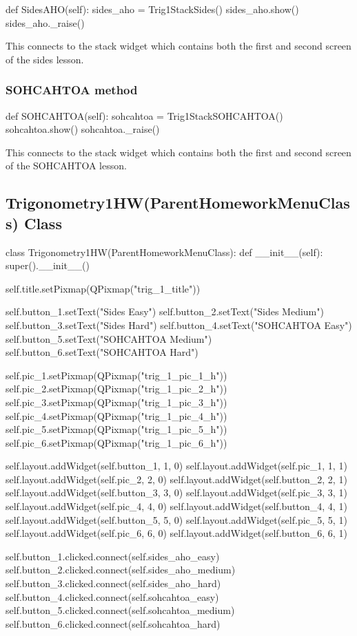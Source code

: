 \begin{python}
def SidesAHO(self):
        sides_aho = Trig1StackSides()
        sides_aho.show()
        sides_aho._raise()
\end{python}

This connects to the stack widget which contains both the first and second screen of the sides lesson.

\subsubsection{SOHCAHTOA method}

\begin{python}
def SOHCAHTOA(self):
        sohcahtoa = Trig1StackSOHCAHTOA()
        sohcahtoa.show()
        sohcahtoa._raise()
\end{python}

This connects to the stack widget which contains both the first and second screen of the SOHCAHTOA lesson.

\subsection{Trigonometry1HW(ParentHomeworkMenuClass) Class}

\begin{python}
class Trigonometry1HW(ParentHomeworkMenuClass):
    def __init__(self):
        super().__init__()

        self.title.setPixmap(QPixmap("trig_1_title"))

        self.button_1.setText("Sides Easy")
        self.button_2.setText("Sides Medium")
        self.button_3.setText("Sides Hard")
        self.button_4.setText("SOHCAHTOA Easy")
        self.button_5.setText("SOHCAHTOA Medium")
        self.button_6.setText("SOHCAHTOA Hard")

        self.pic_1.setPixmap(QPixmap("trig_1_pic_1_h"))
        self.pic_2.setPixmap(QPixmap("trig_1_pic_2_h"))
        self.pic_3.setPixmap(QPixmap("trig_1_pic_3_h"))
        self.pic_4.setPixmap(QPixmap("trig_1_pic_4_h"))
        self.pic_5.setPixmap(QPixmap("trig_1_pic_5_h"))
        self.pic_6.setPixmap(QPixmap("trig_1_pic_6_h"))

        self.layout.addWidget(self.button_1, 1, 0)
        self.layout.addWidget(self.pic_1, 1, 1)
        self.layout.addWidget(self.pic_2, 2, 0)
        self.layout.addWidget(self.button_2, 2, 1)
        self.layout.addWidget(self.button_3, 3, 0)
        self.layout.addWidget(self.pic_3, 3, 1)
        self.layout.addWidget(self.pic_4, 4, 0)
        self.layout.addWidget(self.button_4, 4, 1)
        self.layout.addWidget(self.button_5, 5, 0)
        self.layout.addWidget(self.pic_5, 5, 1)
        self.layout.addWidget(self.pic_6, 6, 0)
        self.layout.addWidget(self.button_6, 6, 1)

        self.button_1.clicked.connect(self.sides_aho_easy)
        self.button_2.clicked.connect(self.sides_aho_medium)
        self.button_3.clicked.connect(self.sides_aho_hard)
        self.button_4.clicked.connect(self.sohcahtoa_easy)
        self.button_5.clicked.connect(self.sohcahtoa_medium)
        self.button_6.clicked.connect(self.sohcahtoa_hard)
\end{python}

